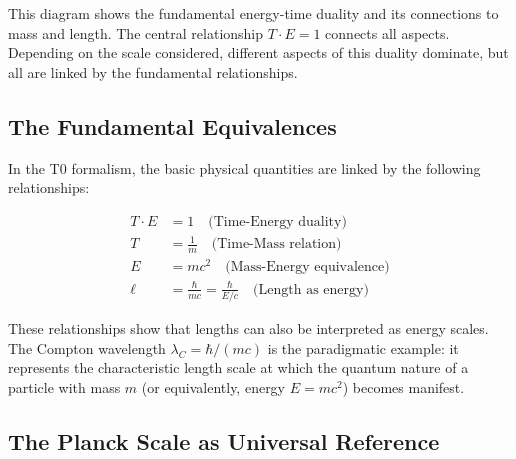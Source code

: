 \documentclass[12pt,a4paper]{article}
\begin{document}
\begin{center}
	\end{center}
	
	This diagram shows the fundamental energy-time duality and its connections to mass and length. The central relationship $T \cdot E = 1$ connects all aspects. Depending on the scale considered, different aspects of this duality dominate, but all are linked by the fundamental relationships.
	
	\subsection{The Fundamental Equivalences}
	
	In the T0 formalism, the basic physical quantities are linked by the following relationships:
	
	\begin{align}
		T \cdot E &= 1 \quad \text{(Time-Energy duality)} \\
		T &= \frac{1}{m} \quad \text{(Time-Mass relation)} \\
		E &= mc^2 \quad \text{(Mass-Energy equivalence)} \\
		\ell &= \frac{\hbar}{mc} = \frac{\hbar}{E/c} \quad \text{(Length as energy)}
	\end{align}
	
	These relationships show that lengths can also be interpreted as energy scales. The Compton wavelength $\lambda_C = \hbar/(mc)$ is the paradigmatic example: it represents the characteristic length scale at which the quantum nature of a particle with mass $m$ (or equivalently, energy $E = mc^2$) becomes manifest.
	
	\subsection{The Planck Scale as Universal Reference}
	
\end{document}
